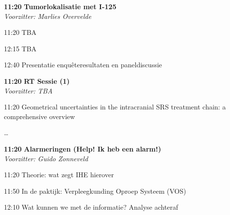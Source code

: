 \documentclass[a4paper,10pt]{report}
\begin{document}
\begin{multicols*}{3}

\begin{packed_enum}
\item[\textbf{11:20}]\textbf{Tumorlokalisatie met I-125}\\\textit{Voorzitter: Marlies Overvelde}
\item[11:20] TBA
\item[12:15] TBA
\item[12:40] Presentatie enquêteresultaten en paneldiscussie
\end{packed_enum} %


\begin{packed_enum}
\item[\textbf{11:20}] \textbf{RT Sessie (1)}\\\textit{Voorzitter: TBA}
\item[11:20] Geometrical uncertainties in the intracranial SRS treatment chain: a comprehensive overview
\item[] \ldots\itemauthor{\ldots}
\end{packed_enum} %


{} %
\begin{packed_enum}
\item[\textbf{11:20}] \textbf{Alarmeringen (Help! Ik heb een alarm!)}\\\textit{Voorzitter: Guido Zonneveld}
\item[11:20] Theorie: wat zegt IHE hierover
\item[11:50] In de paktijk: Verpleegkunding Oproep Systeem (VOS)
\item[12:10] Wat kunnen we met de informatie? Analyse achteraf
\end{packed_enum} %


\end{multicols*}
\end{document}
